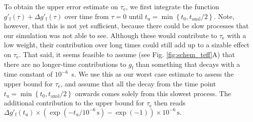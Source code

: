 \documentclass[journal=jpcbfk,manuscript=article,layout=twocolumn]{achemso}
\begin{document}
To obtain the upper error estimate on $\tau_\mathrm e$, we first integrate the function
$g'_{\mathrm{f}}(\tau) + \Delta g'_{\mathrm{f}}(\tau)$ over time from $\tau=0$ until
$
t_\mathrm u= \min
\left\{
	t_0,
	{t_\mathrm{anal}}/{2}
\right\}.
$
Note, however,
that this is not yet sufficient, because there could be slow processes that our simulation was not
able to see. Although these would contribute to $\tau_\mathrm e$ with a low weight,
their contribution over long times could still add up to a sizable effect on $\tau_\mathrm e$.
%
That said, it seems feasible
to assume (see Fig. \ref{fig:schem_teff}A) that there are no longer-time contributions
to $g_\mathrm f$ than something that decays with a time constant of $10^{-6}$~s.
%
We use this as our worst case estimate to assess the upper bound for $\tau_\mathrm e$, and
%
assume that all the decay from the time point
$
t_\mathrm u= \min
\left\{
	t_0,
	{t_\mathrm{anal}}/{2}
\right\}
$
onwards comes solely from this slowest process.
%
The additional contribution to the upper bound for $\tau_\mathrm e$ then reads
$
\Delta g'_\mathrm f(t_\mathrm u) \times \left(\exp(-t_\mathrm u / 10^{-6}\,\mathrm s) - \exp(-1)\right) \times 10^{-6}\,\mathrm s.
$

\end{document}
